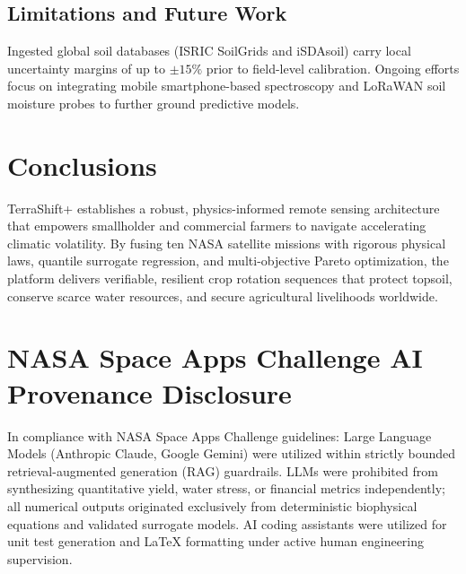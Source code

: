 \documentclass[10pt,twocolumn]{article}
\begin{document}
\subsection{Limitations and Future Work}
Ingested global soil databases (ISRIC SoilGrids and iSDAsoil) carry local uncertainty margins of up to $\pm15\%$ prior to field-level calibration. Ongoing efforts focus on integrating mobile smartphone-based spectroscopy and LoRaWAN soil moisture probes to further ground predictive models.

\section{Conclusions}
TerraShift+ establishes a robust, physics-informed remote sensing architecture that empowers smallholder and commercial farmers to navigate accelerating climatic volatility. By fusing ten NASA satellite missions with rigorous physical laws, quantile surrogate regression, and multi-objective Pareto optimization, the platform delivers verifiable, resilient crop rotation sequences that protect topsoil, conserve scarce water resources, and secure agricultural livelihoods worldwide.

\section*{NASA Space Apps Challenge AI Provenance Disclosure}
In compliance with NASA Space Apps Challenge guidelines: Large Language Models (Anthropic Claude, Google Gemini) were utilized within strictly bounded retrieval-augmented generation (RAG) guardrails. LLMs were prohibited from synthesizing quantitative yield, water stress, or financial metrics independently; all numerical outputs originated exclusively from deterministic biophysical equations and validated surrogate models. AI coding assistants were utilized for unit test generation and LaTeX formatting under active human engineering supervision.
\end{document}
